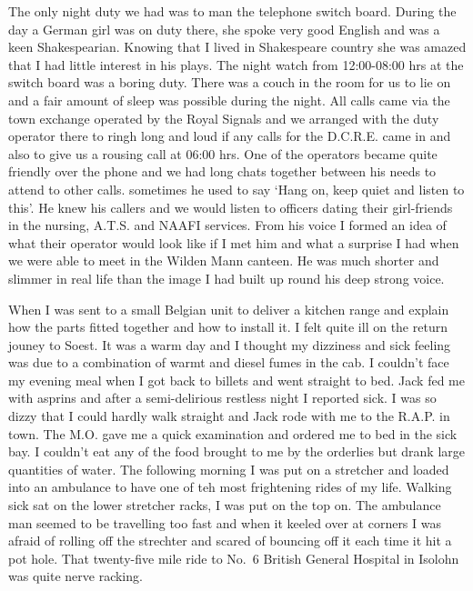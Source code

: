 The only night duty we had was to man the telephone switch
board. During the day a German girl was on duty there, she spoke very
good English and was a keen Shakespearian. Knowing that I lived in
Shakespeare country she was amazed that I had little interest in his
plays. The night watch from 12:00-08:00 hrs at the switch board was a
boring duty. There was a couch in the room for us to lie on and a fair
amount of sleep was possible during the night. All calls came via the
town exchange operated by the Royal Signals and we arranged with the
duty operator there to ringh long and loud if any calls for the
D.C.R.E. came in and also to give us a rousing call at 06:00 hrs. One
of the operators became quite friendly over the phone and we had long
chats together between his needs to attend to other calls. sometimes
he used to say `Hang on, keep quiet and listen to this'. He knew his
callers and we would listen to officers dating their girl-friends in
the nursing, A.T.S. and NAAFI services. From his voice I formed an
idea of what their operator would look like if I met him and what a
surprise I had when we were able to meet in the Wilden Mann
canteen. He was much shorter and slimmer in real life than the image I
had built up round his deep strong voice.

When I was sent to a small Belgian unit to deliver a kitchen range
and explain how the parts fitted together and how to install it. I
felt quite ill on the return jouney to Soest. It was a warm day and I
thought my dizziness and sick feeling was due to a combination of
warmt and diesel fumes in the cab. I couldn't face my evening meal
when I got back to billets and went straight to bed. Jack fed me with
asprins and after a semi-delirious restless night I reported sick. I
was so dizzy that I could hardly walk straight and Jack rode with me
to the R.A.P. in town. The M.O. gave me a quick examination and
ordered me to bed in the sick bay. I couldn't eat any of the food
brought to me by the orderlies but drank large quantities of
water. The following morning I was put on a stretcher and loaded into
an ambulance to have one of teh most frightening rides of my
life. Walking sick sat on the lower stretcher racks, I was put on the
top on. The ambulance man seemed to be travelling too fast and when it
keeled over at corners I was afraid of rolling off the strechter and
scared of bouncing off it each time it hit a pot hole. That
twenty-five mile ride to No.~6 British General Hospital in Isolohn was
quite nerve racking.

